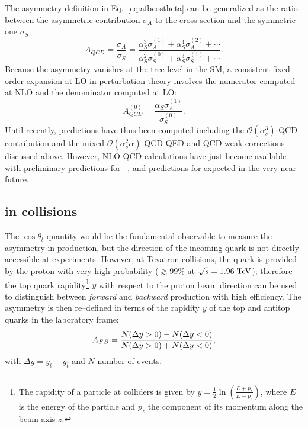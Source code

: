 The asymmetry definition in Eq.~\ref{eq:afbcostheta} can be
generalized as the ratio between the asymmetric contribution
$\sigma_A$ to the cross section and the symmetric one $\sigma_S$:
\begin{equation}
  A_{QCD} = \frac{\sigma_A}{\sigma_S} = 
  \frac{\alpha_S^3\sigma_A^{(1)}+\alpha_S^4\sigma_A^{(2)}+\cdots{}}
  {\alpha_S^2\sigma_S^{(0)}+\alpha_S^3\sigma_S^{(1)}+\cdots{}}.
\end{equation}
Because the asymmetry vanishes at the tree level in the SM, a
consistent fixed-order expansion at LO in perturbation theory involves the
numerator computed at NLO and the denominator computed at LO:
\begin{equation}
  A_{QCD}^{(0)}=\frac{\alpha_S\sigma_A^{(1)}}{\sigma_S^{(0)}}.
\end{equation}
Until recently, predictions have thus been computed including the
$\mathcal{O}(\alpha_s^3)$ QCD contribution and the mixed
$\mathcal{O}(\alpha_s^2\alpha)$ QCD-QED and QCD-weak corrections
discussed above. However, NLO QCD calculations have just become available with
preliminary predictions for \afb{}~\cite{mitov}, and predictions for
\ac{} expected in the very near future.

\subsection{\afb{} in \ppbar{} collisions}

The $\cos\theta_t$ quantity would be the fundamental observable to
measure the asymmetry in \ttbar{} production, but the direction of the
incoming quark is not directly accessible at experiments. However, at
Tevatron \ppbar{} collisions, the quark is provided by the proton with
very high probability ($\gtrsim{}99\%$ at $\sqrt{s}=1.96\; \mathrm{TeV}{}$);
therefore the top quark rapidity\footnote{The rapidity of a particle
  at colliders is given by $y=\frac{1}{2}\ln\left(\frac{E+p_z}{E-p_z}\right)$,
  where $E$ is the energy of the particle and $p_z$ the component of
  its momentum along the beam axis $z$.} $y$ with respect to the
proton beam direction can be used to distinguish between {\it forward}
and {\it backward} production with high efficiency.
The asymmetry \afb{} is then re--defined in terms of the rapidity $y$
of the top and antitop quarks in the laboratory frame: 
\begin{equation}
\label{eq:afb}
A_{FB}{}=\frac{N(\Delta{}y>0)-N(\Delta{}y<0)}{N(\Delta{}y>0)+N(\Delta{}y<0)},
\end{equation}
with $\Delta{}y=y_t - y_{\bar{t}}$ and $N$ number of events.


